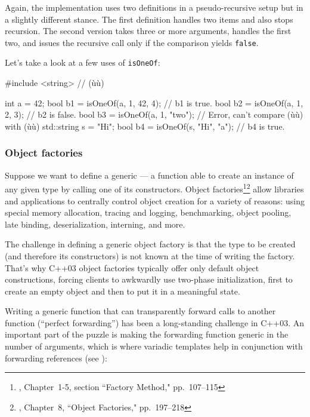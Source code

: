\noindent Again, the implementation uses two definitions in a pseudo-recursive
setup but in a slightly different stance. The first definition handles
two items and also stops recursion. The second version takes three or
more arguments, handles the first two, and issues the recursive call
only if the comparison yields \lstinline!false!.

Let's take a look at a few uses of \lstinline!isOneOf!:

\begin{emcppslisting}
#include <string>                // (ù{}ù)

int a = 42;
bool b1 = isOneOf(a, 1, 42, 4);  // b1 is true.
bool b2 = isOneOf(a, 1, 2, 3);   // b2 is false.
bool b3 = isOneOf(a, 1, "two");  // Error, can't compare (ù{}ù) with (ù{}ù)
std::string s = "Hi";
bool b4 = isOneOf(s, "Hi", "a"); // b4 is true.
\end{emcppslisting}
    

\subsubsection[Object factories]{Object factories}\label{object-factories}

Suppose we want to define a generic  --- a
function able to create an instance of any given type by calling one of
its constructors. Object
factories{\cprotect\footnote{\cite{gamma95}, Chapter~1-5, section
``Factory Method," pp.~107--115}}{\cprotect\footnote{\cite{alexandrescu01},
  Chapter~8, ``Object Factories," pp.~197--218}} allow libraries and
applications to centrally control object creation for a variety of
reasons: using special memory allocation, tracing and logging,
benchmarking, object pooling, late binding, deserialization, interning,
and more.

The challenge in defining a generic object factory is that the type to
be created (and therefore its constructors) is not known at the time of
writing the factory. That's why C++03 object factories typically offer
only default object constructions, forcing clients to awkwardly use
two-phase initialization, first to create an empty object and then to
put it in a meaningful state.

Writing a generic function that can transparently forward calls to
another function (``perfect forwarding'') has been a long-standing
challenge in C++03. An important part of the puzzle is making the
forwarding function generic in the number of arguments, which is where
variadic templates help in conjunction with forwarding references (see
):

